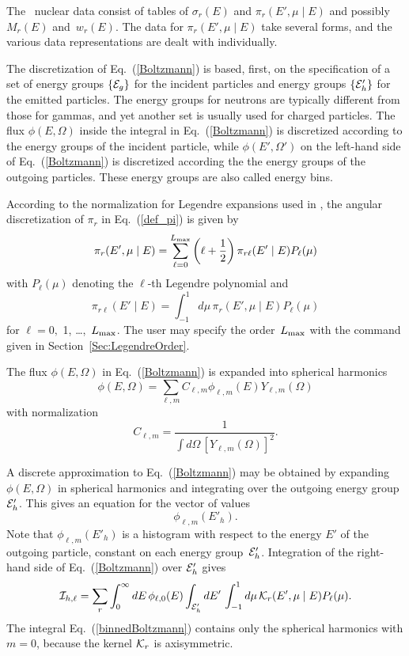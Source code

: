 The \xendl\ nuclear data consist
of tables of $\sigma_r(E)$ and $\pi_r(E', \mu \mid E)$ and possibly
$M_r(E)$ and~$w_r(E)$.
The data for $\pi_r(E', \mu \mid E)$ take several forms, and
the various data representations are dealt with individually.

The discretization of Eq.~(\ref{Boltzmann}) is based, first,
on the specification of a set of energy groups $\{ {\cal E}_g
\}$ for the incident particles and energy groups $\{ {\cal E}'_h
\}$ for the emitted particles.  The energy groups for
neutrons are typically different from those for gammas,
and yet another set is usually used for charged particles.
The flux $\phi(E, \Omega)$ inside the integral in
Eq.~(\ref{Boltzmann}) is discretized according to the energy
groups of the incident particle, while $\phi(E', \Omega')$
on the left-hand side of Eq.~(\ref{Boltzmann}) is discretized
according the the energy groups of the outgoing particles.
These energy groups are also called energy bins.

According to the normalization for Legendre expansions used in \xendl,
the angular discretization of $\pi_r$ in Eq.~(\ref{def_pi}) is 
given by
\begin{equation}
  \pi_r( E', \mu \mid E) =
   \sum_{\ell = 0}^{L_{\text{max}}}
   \left(
     \ell + \frac{1}{2}
   \right)
   \pi_{r\ell}( E' \mid E) P_\ell( \mu)
  \label{def_pi_r}
\end{equation}
with $P_\ell( \mu)$ denoting the $\ell$-th Legendre polynomial
and
\begin{equation}
  \pi_{r\ell}( E' \mid E) =
  \int_{-1}^1 d\mu \, \pi_r( E', \mu \mid E) P_\ell( \mu)
  \label{def_piell}
\end{equation}
for $\ell = 0,$ 1, \ldots,~$L_{\text{max}}$.
The user may specify the order~$L_{\text{max}}$ with the command
given in Section~\ref{Sec:LegendreOrder}.

The flux $\phi(E, \Omega)$ in Eq.~(\ref{Boltzmann}) is expanded 
into spherical harmonics
\begin{equation}
  \phi(E, \Omega) =
  \sum_{\ell, m}
    C_{\ell, m} \phi_{\ell, m}(E) Y_{\ell, m} (\Omega)
 \label{sphHarmonics}
\end{equation}
with normalization
$$
  C_{\ell, m} = \frac{1}{\int d\Omega \, [Y_{\ell, m} (\Omega)]^2}.
$$

A discrete approximation to Eq.~(\ref{Boltzmann}) may be obtained
by expanding $\phi(E, \Omega)$ in spherical harmonics and integrating
over the outgoing energy group~${\cal E}'_h$.
This gives an
equation for the vector of values
$$
  \phi_{\ell, m}(E'_h).
$$
Note that $\phi_{\ell, m}(E'_h)$ is a histogram with respect to
the energy $E'$ of the outgoing particle, constant on each energy
group~${\cal E}'_h$.
Integration of the
right-hand side of Eq.~(\ref{Boltzmann}) over ${\cal E}'_h$ gives
\begin{equation}
  {\cal I}_{h,\ell} = \sum_r
  \int_0^\infty dE \, \phi_{\ell, 0}(E)
  \int_{{\cal E}'_h } dE' \, \int_{-1}^1 d\mu \,
  {\cal K}_r(E', \mu \mid E) P_\ell( \mu ).
  \label{binnedBoltzmann}
\end{equation}
The integral Eq.~(\ref{binnedBoltzmann}) contains only the spherical
harmonics with $m = 0$, because the kernel ${\cal K}_r$ is axisymmetric.

